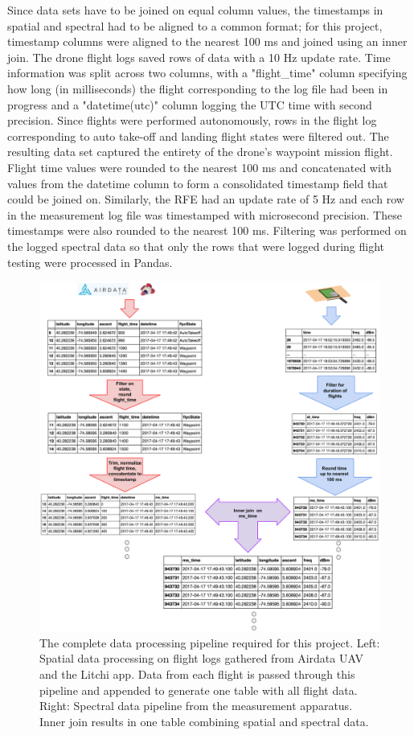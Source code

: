 \documentclass[pageno]{jpaper}
\begin{document}
Since data sets have to be joined on equal column values, the timestamps in spatial and spectral had to be aligned to a common format; for this project, timestamp columns were aligned to the nearest 100 ms and joined using an inner join. The drone flight logs saved rows of data with a 10 Hz update rate. Time information was split across two columns, with a "flight\_time" column specifying how long (in milliseconds) the flight corresponding to the log file had been in progress and a "datetime(utc)" column logging the UTC time with second precision. Since flights were performed autonomously, rows in the flight log corresponding to auto take-off and landing flight states were filtered out. The resulting data set captured the entirety of the drone's waypoint mission flight. Flight time values were rounded to the nearest 100 ms and concatenated with values from the datetime column to form a consolidated timestamp field that could be joined on. Similarly, the RFE had an update rate of 5 Hz and each row in the measurement log file was timestamped with microsecond precision. These timestamps were also rounded to the nearest 100 ms. Filtering was performed on the logged spectral data so that only the rows that were logged during flight testing were processed in Pandas. 

\begin{figure}[!ht]
	\caption{The complete data processing pipeline required for this project. Left: Spatial data processing on flight logs gathered from Airdata UAV and the Litchi app. Data from each flight is passed through this pipeline and appended to generate one table with all flight data. Right: Spectral data pipeline from the measurement apparatus. Inner join results in one table combining spatial and spectral data.}
	\centerline{\includegraphics{data_pipeline}}
\end{figure}
\end{document}
